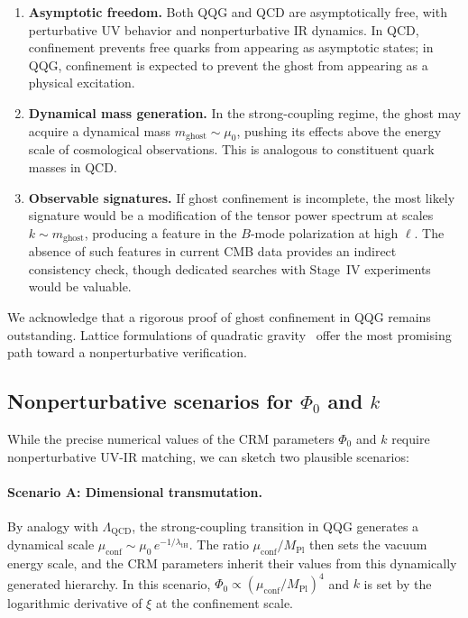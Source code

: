 \documentclass[aps,prd,twocolumn,superscriptaddress,nofootinbib]{revtex4-2}
\begin{document}
\begin{enumerate}
\item \textbf{Asymptotic freedom.} Both QQG and QCD are asymptotically free, with perturbative UV behavior and nonperturbative IR dynamics. In QCD, confinement prevents free quarks from appearing as asymptotic states; in QQG, confinement is expected to prevent the ghost from appearing as a physical excitation.

\item \textbf{Dynamical mass generation.} In the strong-coupling regime, the ghost may acquire a dynamical mass $m_\mathrm{ghost} \sim \mu_0$, pushing its effects above the energy scale of cosmological observations. This is analogous to constituent quark masses in QCD.

\item \textbf{Observable signatures.} If ghost confinement is incomplete, the most likely signature would be a modification of the tensor power spectrum at scales $k \sim m_\mathrm{ghost}$, producing a feature in the $B$-mode polarization at high $\ell$. The absence of such features in current CMB data provides an indirect consistency check, though dedicated searches with Stage~IV experiments would be valuable.
\end{enumerate}

We acknowledge that a rigorous proof of ghost confinement in QQG remains outstanding. Lattice formulations of quadratic gravity~\cite{HoldomRen2016} offer the most promising path toward a nonperturbative verification.

\subsection{Nonperturbative scenarios for $\Phi_0$ and $k$}
\label{sec:nonperturbative}

While the precise numerical values of the CRM parameters $\Phi_0$ and $k$ require nonperturbative UV-IR matching, we can sketch two plausible scenarios:

\paragraph{Scenario A: Dimensional transmutation.}
By analogy with $\Lambda_\mathrm{QCD}$, the strong-coupling transition in QQG generates a dynamical scale $\mu_\mathrm{conf} \sim \mu_0\,e^{-1/\lambda_\mathrm{tH}}$. The ratio $\mu_\mathrm{conf}/M_\mathrm{Pl}$ then sets the vacuum energy scale, and the CRM parameters inherit their values from this dynamically generated hierarchy. In this scenario, $\Phi_0 \propto (\mu_\mathrm{conf}/M_\mathrm{Pl})^4$ and $k$ is set by the logarithmic derivative of $\xi$ at the confinement scale.
\end{document}
